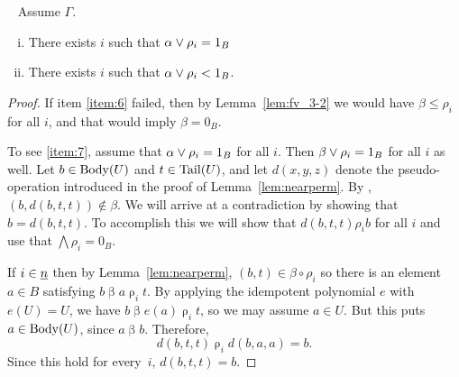 \documentclass{ws-ijac}
\begin{document}
\begin{lemma}\
  \label{lem:fv_3-3}
  Assume $\Gamma$.
  \begin{enumerate}[(i)]
    \item \label{item:6} There exists $i$
      such that $\alpha \join \rho_i = 1_B$
    \item \label{item:7} There exists $i$ such that
      $\alpha \join \rho_i < 1_B$.
  \end{enumerate}
\end{lemma}
\begin{proof}
If item \eqref{item:6} failed, then by Lemma~\ref{lem:fv_3-2} we would
have $\beta \leq \rho_i$ for all $i$, and that
would imply $\beta = 0_B$.

To see \eqref{item:7}, assume that
$\alpha \join \rho_i = 1_B$ for all $i$.  Then $\beta \join \rho_i = 1_B$ for all $i$ as well.
Let $b \in \operatorname{Body}(U)$ and $t \in \operatorname{Tail}(U)$, and let $d(x,y,z)$
denote the pseudo-\malcev operation introduced in the proof of Lemma~\ref{lem:nearperm}. By
\cite[Lemma~4.25]{HM:1988},  $(b, d(b,t,t)) \notin \beta$.
We will arrive at a contradiction by showing that
$b = d(b,t,t)$. To accomplish this we will show that $d(b,t,t) \rho_i b$ for all $i$ and use that $\bigwedge \rho_i = 0_B$.

If $i \in \underline{n}$ then by Lemma~\ref{lem:nearperm},
$(b,t) \in \beta \circ \rho_i$ so
there is an element $a \in B$ satisfying
$b\mathrel\beta a \mathrel\rho_i t$. By applying the idempotent
polynomial $e$ with $e(U) = U$, we have
$b\mathrel\beta e(a) \mathrel\rho_i t$, so we may
assume $a \in U$. But this puts $a \in \operatorname{Body}(U)$,
since $a\mathrel \beta b$. Therefore,
\[
d(b,t,t) \mathrel\rho_i d(b,a,a) = b.
\]
Since this hold for every~$i$, $d(b,t,t) = b$.
\end{proof}


\end{document}
